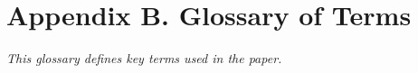 \clearpage
\section*{Appendix B. Glossary of Terms}

\textit{This glossary defines key terms used in the paper.}


